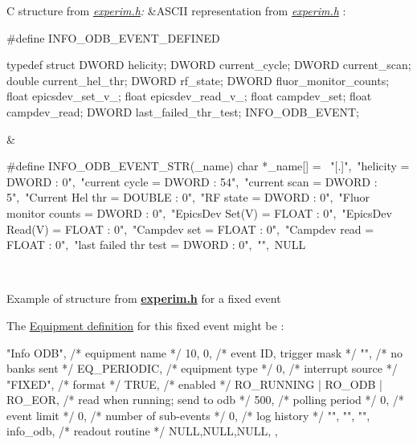 \begin{table}[h]\begin{TabularC}{2}
\hline
C structure from {\itshape \hyperlink{experim_8h}{experim.h}:\/}   &ASCII representation from {\itshape \hyperlink{experim_8h}{experim.h}\/} :   \\

\begin{DoxyCode}
#define INFO_ODB_EVENT_DEFINED

typedef struct {
  DWORD     helicity;
  DWORD     current_cycle;
  DWORD     current_scan;
  double    current_hel_thr;
  DWORD     rf_state;
  DWORD     fluor_monitor_counts;
  float     epicsdev_set_v_;
  float     epicsdev_read_v_;
  float     campdev_set;
  float     campdev_read;
  DWORD     last_failed_thr_test;
} INFO_ODB_EVENT;
\end{DoxyCode}
 &
\begin{DoxyCode}
#define INFO_ODB_EVENT_STR(_name)
           char *_name[] = {\
"[.]",\
"helicity = DWORD : 0",\
"current cycle = DWORD : 54",\
"current scan = DWORD : 5",\
"Current Hel thr = DOUBLE : 0",\
"RF state = DWORD : 0",\
"Fluor monitor counts = DWORD : 0",\
"EpicsDev Set(V) = FLOAT : 0",\
"EpicsDev Read(V) = FLOAT : 0",\
"Campdev set = FLOAT : 0",\
"Campdev read = FLOAT : 0",\
"last failed thr test = DWORD : 0",\
"",\
NULL }
\end{DoxyCode}
 \\\cline{1-2}
\end{TabularC}
\centering
\caption{Example of structure from {\bfseries \hyperlink{experim_8h}{experim.h}} for a fixed event }
\end{table}


\label{FE_bank_construction_FE_RO_ODB_example}
\hypertarget{FE_bank_construction_FE_RO_ODB_example}{}
 The \hyperlink{FE_table}{Equipment definition} for this fixed event might be : 
\begin{DoxyCode}
 { "Info ODB",     /* equipment name */
    10, 0,         /* event ID, trigger mask */
    "",            /* no banks sent */
    EQ_PERIODIC,   /* equipment type */
    0,             /* interrupt source */
    "FIXED",       /* format */
    TRUE,          /* enabled */
    RO_RUNNING | RO_ODB | 
          RO_EOR,  /* read when running; 
                      send to odb */
    500,           /* polling period */
    0,             /* event limit */
    0,             /* number of sub-events */
    0,             /* log history */
    "", "", "",
    info_odb,      /* readout routine */
    NULL,NULL,NULL,
  },
\end{DoxyCode}


